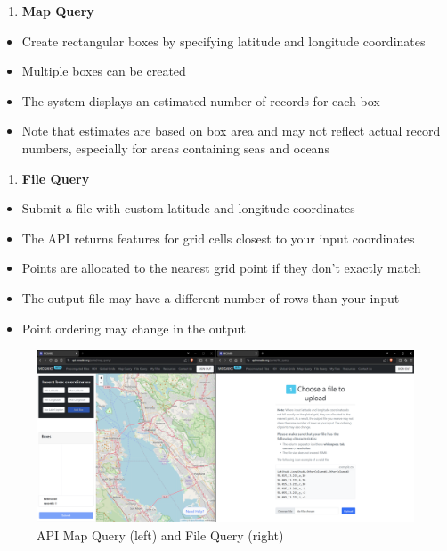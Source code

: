 \documentclass[
  letterpaper,
  DIV=11,
  numbers=noendperiod]{scrreprt}
\providecommand{\tightlist}{%
  \setlength{\itemsep}{0pt}\setlength{\parskip}{0pt}}\usepackage{longtable,booktabs,array}
\begin{document}
\begin{enumerate}
\def\labelenumi{\arabic{enumi}.}
\tightlist
\item
  \textbf{Map Query}
\end{enumerate}

\begin{itemize}
\tightlist
\item
  Create rectangular boxes by specifying latitude and longitude
  coordinates
\item
  Multiple boxes can be created
\item
  The system displays an estimated number of records for each box
\item
  Note that estimates are based on box area and may not reflect actual
  record numbers, especially for areas containing seas and oceans
\end{itemize}

\begin{enumerate}
\def\labelenumi{\arabic{enumi}.}
\setcounter{enumi}{1}
\tightlist
\item
  \textbf{File Query}
\end{enumerate}

\begin{itemize}
\tightlist
\item
  Submit a file with custom latitude and longitude coordinates
\item
  The API returns features for grid cells closest to your input
  coordinates
\item
  Points are allocated to the nearest grid point if they don't exactly
  match
\item
  The output file may have a different number of rows than your input
\item
  Point ordering may change in the output
\end{itemize}

\begin{figure}

{\centering \includegraphics{images/api-map-n-file.png}

}

\caption{API Map Query (left) and File Query (right)}

\end{figure}
\end{document}
